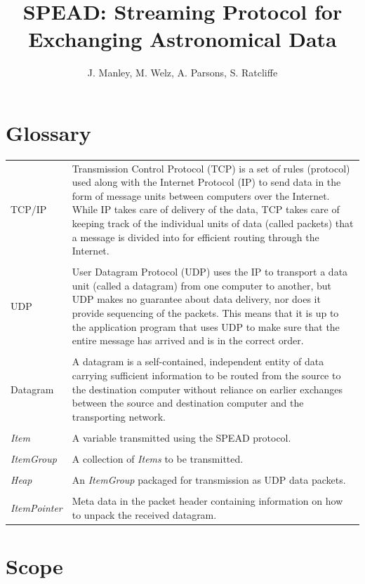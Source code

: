 \documentclass[11pt,english,twoside]{article}
\begin{document}
\title{SPEAD: Streaming Protocol for Exchanging Astronomical Data}
\author{J. Manley, M. Welz, A. Parsons, S. Ratcliffe}
\makekatdocbeginning


\section{Glossary}
\begin{tabular}{l|p{14cm}}
TCP/IP
&
Transmission Control Protocol (TCP) is a set of rules (protocol) used along with the Internet Protocol (IP) to send data in the form of message
units between computers over the Internet. While IP takes care of delivery of the data, TCP takes care of keeping track of the individual units
of data (called packets) that a message is divided into for efficient routing through the Internet.  \\
& \\
UDP
&
User Datagram Protocol (UDP) uses the IP to transport a data unit (called a datagram) from one computer to another, but UDP makes no guarantee
about data delivery, nor does it provide sequencing of the packets. This means that it is up to the application program that uses UDP to make
sure that the entire message has arrived and is in the correct order.  \\
& \\
Datagram
&
A datagram is a self-contained, independent entity of data carrying sufficient information to be routed from the source to the destination
computer without reliance on earlier exchanges between the source and destination computer and the transporting network. \\
& \\
\emph{Item}
&
A variable transmitted using the SPEAD protocol. \\
& \\
\emph{ItemGroup}
&
A collection of \emph{Items} to be transmitted. \\
& \\
\emph{Heap}
&
An \emph{ItemGroup} packaged for transmission as UDP data packets. \\
& \\
\emph{ItemPointer}
&
Meta data in the packet header containing information on how to unpack the received datagram.
\end{tabular}

\newpage

\section{Scope}
\end{document}
